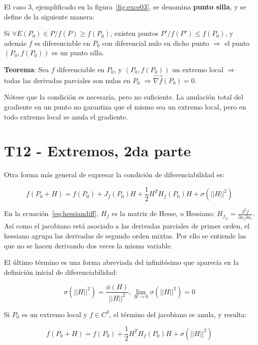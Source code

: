 \documentclass{article}
\begin{document}
El caso 3, ejemplificado en la figura~\ref{fig:exce03}, se denomina \textbf{punto silla}, y se define de la siguiente manera:

Si $\forall E(P_0) \in P / f(P) \geq f(P_0)$, existen puntos $P' / f(P') \leq f(P_0)$, y además $f$ es diferenciable en $P_0$ con diferencial nulo en dicho punto $\Rightarrow$ el punto $(P_0, f(P_0))$ es un punto silla.

\textbf{Teorema}: Sea $f$ diferenciable en $P_0$, y $(P_0, f(P_0))$ un extremo local $\Rightarrow$ todas las derivadas parciales son nulas en $P_0$ $\Rightarrow \overrightarrow{\nabla f}(P_0) = 0$.

Nótese que la condición es necesaria, pero no suficiente. La anulación total del gradiente en un punto no garantiza que el mismo sea un extremo local, pero en todo extremo local se anula el gradiente.

\section{T12 - Extremos, 2da parte}

Otra forma más general de expresar la condición de diferenciabilidad es:

\begin{equation}
f(P_0 + H) = f(P_0) + J_f(P_0) H + \frac{1}{2} H^T H_f(P_0) H + \sigma( ||H||^2 )
\label{eq:hessiandiff}
\end{equation}

En la ecuación~\ref{eq:hessiandiff}, $H_f$ es la matriz de Hesse, o Hessiano: $H_{f_{ij}} = \frac{\partial^2 f}{\partial x_j \partial x_i}$. Así como el jacobiano está asociado a las derivadas parciales de primer orden, el hessiano agrupa las derivadas de segundo orden mixtas. Por ello se entiende las que no se hacen derivando dos veces la misma variable.

El último término es una forma abreviada del infinitésimo que aparecía en la definición inicial de diferenciabilidad:

\begin{equation}
\sigma(||H||^2) = \frac{\phi(H)}{||H||^2}, \lim_{H \rightarrow 0}  \sigma(||H||^2) = 0
\end{equation}

Si $P_0$ es un extremo local y $f \in C^3$, el término del jacobiano se anula, y resulta:

\begin{equation}
f(P_0 + H) = f(P_0) + \frac{1}{2} H^T H_f(P_0) H + \sigma(||H||^2)
\end{equation}
\end{document}
